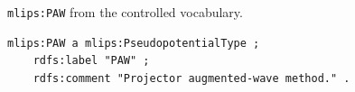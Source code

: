 \texttt{mlips:PAW} from the controlled vocabulary.
\begin{lstlisting}[language=turtle]
mlips:PAW a mlips:PseudopotentialType ;
    rdfs:label "PAW" ;
    rdfs:comment "Projector augmented-wave method." .
\end{lstlisting}
